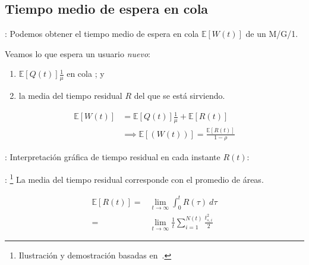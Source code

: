 \documentclass[xcolor={x11names}]{beamer}
\begin{document}
\subsection{Tiempo medio de espera en cola}
\begin{frame}{\secname: \subsecname}
    Podemos obtener el tiempo medio
    de espera en cola $\mathbb{E}[W(t)]$ de
    un M/G/1.
    \begin{figure}
        
    \end{figure}
    Veamos lo que espera un usuario
    \emph{nuevo}:
    \begin{enumerate}
        \item $\mathbb{E}[Q(t)]\tfrac{1}{\mu}$
            en cola ; y
        \item la media del tiempo residual
            $R$ del que
            se está sirviendo.
    \end{enumerate}
    \begin{align*}
        \mathbb{E}[W(t)]&=
        \mathbb{E}[Q(t)]\tfrac{1}{\mu}
        + \mathbb{E}[R(t)]\\
        &\implies \mathbb{E}[(W(t))]=
        \frac{\mathbb{E}[R(t)]}{1-\rho}
    \end{align*}
\end{frame}




\begin{frame}{\secname: \subsecname}
    Interpretación gráfica de tiempo
    residual en cada instante $R(t)$:
    \begin{figure}
        
    \end{figure}
\end{frame}



\begin{frame}{\secname: \subsecname}
    \footnote{
    Ilustración y demostración basadas
    en~\cite[Figura 8.3]{amable}.}
    La media del tiempo residual corresponde
    con el promedio de áreas.
    \begin{figure}
        
    \end{figure}
    \begin{align*}
        \mathbb{E}[R(t)]=&\lim_{t\to\infty}
        \int_0^t
        R(\tau)\ d\tau\\
        =& \lim_{t\to\infty} \frac{1}{t}
        \sum_{i=1}^{N(t)} \frac{t_{s,i}^2}{2}
    \end{align*}
\end{frame}
\end{document}

